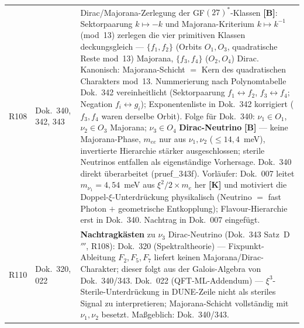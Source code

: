 \begin{longtable}{@{}p{0.9cm}p{3.1cm}p{10.2cm}@{}}
R108 & Dok.~340, 342, 343 & Dirac/Majorana-Zerlegung der GF$(27)^*$-Klassen \textbf{[B]}: Sektorpaarung $k\mapsto-k$ und Majorana-Kriterium $k\mapsto k^{-1}$ (mod~13) zerlegen die vier primitiven Klassen deckungsgleich --- $\{f_1,f_2\}$ (Orbits $O_1,O_3$, quadratische Reste mod~13) Majorana, $\{f_3,f_4\}$ ($O_2,O_4$) Dirac. Kanonisch: Majorana-Schicht $=$ Kern des quadratischen Charakters mod~13. Nummerierung nach Polynomtabelle Dok.~342 vereinheitlicht (Sektorpaarung $f_1\leftrightarrow f_2$, $f_3\leftrightarrow f_4$; Negation $f_i\leftrightarrow g_i$); Exponentenliste in Dok.~342 korrigiert ($f_3,f_4$ waren derselbe Orbit). Folge für Dok.~340: $\nu_1\in O_1$, $\nu_2\in O_3$ Majorana; $\nu_3\in O_4$ \textbf{Dirac-Neutrino} \textbf{[B]} --- keine Majorana-Phase, $m_{ee}$ nur aus $\nu_1,\nu_2$ ($\leq14{,}4$~meV), invertierte Hierarchie stärker ausgeschlossen; sterile Neutrinos entfallen als eigenständige Vorhersage. Dok.~340 direkt überarbeitet (pruef\_343f). Vorläufer: Dok.~007 leitet $m_{\nu_1}=4{,}54$~meV aus $\xi^2/2\times m_e$ her \textbf{[K]} und motiviert die Doppel-$\xi$-Unterdrückung physikalisch (Neutrino $=$ fast Photon $+$ geometrische Entkopplung); Flavour-Hierarchie erst in Dok.~340. Nachtrag in Dok.~007 eingefügt. \\
R110 & Dok.~320, 022 & \textbf{Nachtragkästen} zu $\nu_3$ Dirac-Neutrino (Dok.~343 Satz~D$'''$, R108): Dok.~320 (Spektraltheorie) --- Fixpunkt-Ableitung $F_2,F_5,F_7$ liefert keinen Majorana/Dirac-Charakter; dieser folgt aus der Galois-Algebra von Dok.~340/343. Dok.~022 (QFT-ML-Addendum) --- $\xi^3$-Sterile-Unterdrückung in DUNE-Zeile nicht als steriles Signal zu interpretieren; Majorana-Schicht vollständig mit $\nu_1,\nu_2$ besetzt. Maßgeblich: Dok.~340/343. \\

\end{longtable}
